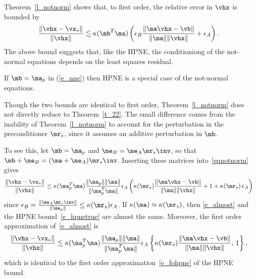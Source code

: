 \documentclass[final]{siamart220329}%
\begin{document}
Theorem~\ref{l_notnorm} shows that, to first order, the relative error in $\vhx$ is bounded by
\begin{equation} \label{e_fonne}
        \frac{\|\vhx-\vx_*\|}{\|\vhx\|}\lesssim\kappa(\mb^T\ma)\left(\epsilon_B\frac{\|\ma\vhx-\vb\|}{\|\ma\|\|\vhx\|}+\epsilon_A\right).
    \end{equation}
The above bound suggests that, like the HPNE, the 
conditioniong of the not-normal equations depends on the least squares residual. 


\begin{remark}
If $\mb=\ma_p$ in (\ref{e_nne}) then HPNE is a special case of the not-normal equations. 

Though the two bounds are identical to first order,
Theorem~\ref{l_notnorm} does not directly reduce to Theorem~\ref{t_22}. 
The small difference comes from the inability of Theorem~\ref{l_notnorm} to account for the perturbation in the preconditioner $\mr_s$, since it assumes an additive perturbation in $\mb$.

To see this, let $\mb=\ma_p$ and $\me_B=\me_A\mr_s\inv$, so that  $\mb+\me_B=(\ma+\me_A)\mr_s\inv$. Inserting these matrices into~\eqref{eqnotnorm} gives 
 \begin{align}\label{e_almost}
         \frac{\|\vhx-\vx_*\|}{\|\vhx\|}\leq\kappa(\ma_p^T\ma)\frac{\|\ma_p\|\|\ma\|}{\|\ma_p^T\ma\|}\epsilon_A\left(\kappa(\mr_s)\frac{\|\ma\vhx-\vb\|}{\|\ma\|\|\vhx\|}+1+\kappa(\mr_s)\,\epsilon_A\right)
     \end{align}   
since $\epsilon_B=\frac{\|\me_A\mr_s\inv\|}{\|\ma_p\|}\leq\kappa(\mr_s)\epsilon_A$. If $\kappa(\ma)\approx\kappa(\mr_s)$, then \eqref{e_almost} and the HPNE bound~\eqref{e_hpnetrue} are almost the same. Moreover, the first order approximation of~\eqref{e_almost} is  
\begin{align}\label{e_almost2}
         \frac{\|\vhx-\vx_*\|}{\|\vhx\|}\lesssim\kappa(\ma_p^T\ma)\frac{\|\ma_p\|\|\ma\|}{\|\ma_p^T\ma\|}\epsilon_A
\left\{\kappa(\mr_s)\frac{\|\ma\vhx-\vb\|}{\|\ma\|\|\vhx\|},\,1\right\},
     \end{align}   
which is identical to the first order approximation~\eqref{e_fohpne} of the HPNE bound.
\end{remark}
\end{document}
